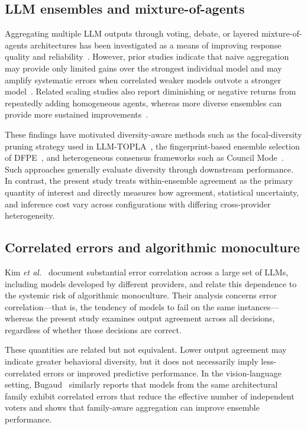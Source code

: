 \documentclass{ieeeaccess}
\begin{document}
\subsection{LLM ensembles and mixture-of-agents}
Aggregating multiple LLM outputs through voting, debate, or layered
mixture-of-agents architectures has been investigated as a means of improving
response quality and reliability~\cite{du2023debate,wang2024moa,chen2025survey}.
However, prior studies indicate that naive aggregation may provide only limited
gains over the strongest individual model and may amplify systematic errors when
correlated weaker models outvote a stronger model~\cite{kim2025correlated}.
Related scaling studies also report diminishing or negative returns from
repeatedly adding homogeneous agents, whereas more diverse ensembles can provide
more sustained improvements~\cite{li2024moreagents}.

These findings have motivated diversity-aware methods such as the
focal-diversity pruning strategy used in LLM-TOPLA~\cite{tekin2024topla}, the
fingerprint-based ensemble selection of DFPE~\cite{dfpe2025}, and heterogeneous
consensus frameworks such as Council Mode~\cite{council2026}. Such approaches
generally evaluate diversity through downstream performance. In contrast, the
present study treats within-ensemble agreement as the primary quantity of
interest and directly measures how agreement, statistical uncertainty, and
inference cost vary across configurations with differing cross-provider
heterogeneity.

\subsection{Correlated errors and algorithmic monoculture}
Kim \textit{et al.}~\cite{kim2025correlated} document substantial error
correlation across a large set of LLMs, including models developed by different
providers, and relate this dependence to the systemic risk of algorithmic
monoculture. Their analysis concerns error correlation---that is, the tendency
of models to fail on the same instances---whereas the present study examines
output agreement across all decisions, regardless of whether those decisions are
correct.

These quantities are related but not equivalent. Lower output agreement may
indicate greater behavioral diversity, but it does not necessarily imply
less-correlated errors or improved predictive performance. In the
vision-language setting, Bugaud~\cite{bugaud2026} similarly reports that models
from the same architectural family exhibit correlated errors that reduce the
effective number of independent voters and shows that family-aware aggregation
can improve ensemble performance.
\end{document}
